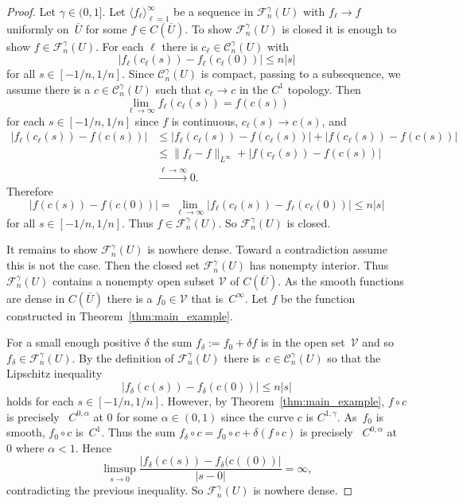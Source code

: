 \documentclass[10pt,a4paper]{amsart}
\newcommand{\adj}{{precisely }} %
\newcommand{\la}{\langle}	   	%
\newcommand{\ra}{\rangle}          	%
\begin{document}
\begin{proof}
Let $\gamma \in (0,1]$. 
Let $\la f_\ell\ra_{\ell =1}^\infty$ be a sequence in $\mathcal F_n^\gamma (U)$
with  $f_\ell \to f$ uniformly  on~$\overline U$
for some   $f\in C(\overline U)$.
To show $\mathcal F_n^\gamma (U)$ is closed it is enough to show
$f\in\mathcal F_n^\gamma (U)$. 
For each $\ell$ there is
 $c_\ell \in \mathcal C_n^\gamma (U)$
with 
$$
| f_\ell(c_\ell(s)) - f_\ell(c_\ell(0))|\le n |s|
$$
for all $s\in [-1/n,1/n]$.
Since  $\mathcal C_n^\gamma (U)$ is compact, 
passing to a subsequence, we  assume there
is a $c\in \mathcal C_n^\gamma (U)$  such that
$c_\ell \to c$ in the $C^1$ topology.
Then
$$
\lim_{\ell \to \infty} f_\ell(c_\ell(s)) = f(c(s))
$$
for each  $s\in [-1/n,1/n]$ since
$f$ is continuous, $c_\ell(s)\to c(s)$, and 
\begin{align*}
  |f_\ell(c_\ell(s))- f(c(s))|&\le |f_\ell(c_\ell(s)) - f(c_\ell(s))| 
        + |f(c_\ell(s)) - f(c(s))|\\
    &\le \| f_\ell - f\|_{L^\infty} + |f(c_\ell(s)) - f(c(s))|\\
    & \stackrel{\ell\to \infty}{\longrightarrow} 0.
\end{align*}
Therefore
$$
|f(c(s)) - f(c(0))| = \lim_{\ell\to \infty} |f_\ell(c_\ell(s))-f_\ell(c_\ell(0))|
\le n |s|
$$
for all $s\in [-1/n,1/n]$.  
Thus $f\in \mathcal F_n^\gamma (U)$.
So  $\mathcal F_n^\gamma (U)$ is closed.


It remains to show $\mathcal F_n^\gamma (U)$ is nowhere dense. 
Toward a contradiction assume this is not the case.
Then the closed set $\mathcal F_n^\gamma (U)$ has nonempty interior. 
Thus $\mathcal F_n^\gamma (U)$ contains 
a nonempty  open subset $\mathcal V$ of $C(\overline U)$.
As  the  smooth functions are dense in $C(\overline U)$
there is a $f_0\in \mathcal V$ that is~$C^\infty$.
Let $f$ be the function constructed in  Theorem~\ref{thm:main_example}.


For a small enough positive $\delta$
the sum $f_\delta:=f_0+\delta f$ 
is in the open set~$\mathcal V$ and
so $f_\delta \in  \mathcal F_n^\gamma (U)$.
%  
By the definition of $ \mathcal F_n^\gamma (U)$
there is~$c\in \mathcal C_n^\gamma  (U)$ so that
the Lipschitz inequality
\begin{equation*}
    |f_\delta(c(s)) - f_\delta(c(0))| \le n |s|
\end{equation*}
holds for each  $s\in[-1/n,1/n]$.
%
However, by Theorem~\ref{thm:main_example}, $f\circ c$ is \adj~$C^{0,\alpha}$
at $0$ for some $\alpha\in (0,1)$
since the curve $c$ is $C^{1,\gamma}$.
As~$f_0$ is smooth, $f_0\circ c$ is~$C^1$.
%
Thus the sum $f_\delta\circ c = f_0\circ c +  \delta ( f\circ c) $
is \adj~$C^{0,\alpha}$ at~$0$ where $\alpha<1$.
Hence 
\begin{equation*} 
   \limsup_{s\to 0}  \frac{|f_\delta(c(s)) -f_\delta(c((0))|}{|s-0|} = \infty, 
  \end{equation*} 
contradicting  the previous 
inequality.
So  $\mathcal F_n^\gamma (U)$ is nowhere dense.
\end{proof}  
\end{document}
